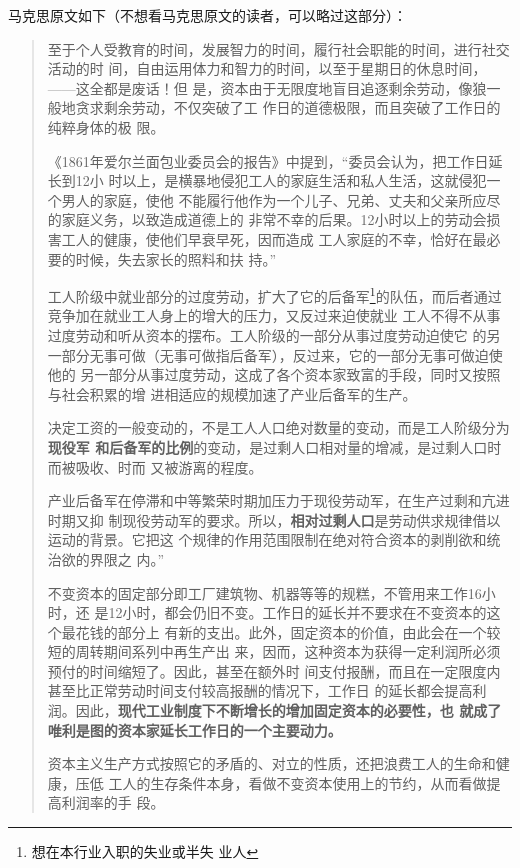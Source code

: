 马克思原文如下（不想看马克思原文的读者，可以略过这部分）：
\begin{quotation}
  至于个人受教育的时间，发展智力的时间，履行社会职能的时间，进行社交活动的时
  间，自由运用体力和智力的时间，以至于星期日的休息时间，——这全都是废话！但
  是，资本由于无限度地盲目追逐剩余劳动，像狼一般地贪求剩余劳动，不仅突破了工
  作日的道德极限，而且突破了工作日的纯粹身体的极
  限。\cite[306]{capital}

  《1861年爱尔兰面包业委员会的报告》中提到，“委员会认为，把工作日延长到12小
  时以上，是横暴地侵犯工人的家庭生活和私人生活，这就侵犯一个男人的家庭，使他
  不能履行他作为一个儿子、兄弟、丈夫和父亲所应尽的家庭义务，以致造成道德上的
  非常不幸的后果。12小时以上的劳动会损害工人的健康，使他们早衰早死，因而造成
  工人家庭的不幸，恰好在最必要的时候，失去家长的照料和扶
  持。”\cite[292]{capital}

  工人阶级中就业部分的过度劳动，扩大了它的后备军\footnote{想在本行业入职的失业或半失
    业人}的队伍，而后者通过竞争加在就业工人身上的增大的压力，又反过来迫使就业
  工人不得不从事过度劳动和听从资本的摆布。工人阶级的一部分从事过度劳动迫使它
  的另一部分无事可做（无事可做指后备军），反过来，它的一部分无事可做迫使他的
  另一部分从事过度劳动，这成了各个资本家致富的手段，同时又按照与社会积累的增
  进相适应的规模加速了产业后备军的生产。\cite[733]{capital}

  决定工资的一般变动的，不是工人人口绝对数量的变动，而是工人阶级分为\textbf{现役军
    和后备军的比例}的变动，是过剩人口相对量的增减，是过剩人口时而被吸收、时而
  又被游离的程度。\cite[733]{capital}

  产业后备军在停滞和中等繁荣时期加压力于现役劳动军，在生产过剩和亢进时期又抑
  制现役劳动军的要求。所以，\textbf{相对过剩人口}是劳动供求规律借以运动的背景。它把这
  个规律的作用范围限制在绝对符合资本的剥削欲和统治欲的界限之
  内。”\cite[736]{capital}

  不变资本的固定部分即工厂建筑物、机器等等的规糕，不管用来工作16小时，还
  是12小时，都会仍旧不变。工作日的延长并不要求在不变资本的这个最花钱的部分上
  有新的支出。此外，固定资本的价值，由此会在一个较短的周转期间系列中再生产出
  来，因而，这种资本为获得一定利润所必须预付的时间缩短了。因此，甚至在额外时
  间支付报酬，而且在一定限度内甚至比正常劳动时间支付较高报酬的情况下，工作日
  的延长都会提高利润。因此，\textbf{现代工业制度下不断增长的增加固定资本的必要性，也
  就成了唯利是图的资本家延长工作日的一个主要动力。}\cite[91]{capital3}

  资本主义生产方式按照它的矛盾的、对立的性质，还把浪费工人的生命和健康，压低
  工人的生存条件本身，看做不变资本使用上的节约，从而看做提高利润率的手
  段。\cite[101]{capital3}
\end{quotation}


